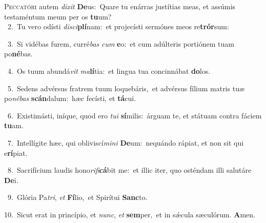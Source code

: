 \lettrine{\initial\textcolor{\initialcolor}{P}}{eccatóri} autem \textit{di}\-\textit{xit} \textbf{De}\-us:~\star Quare tu enárras justítias meas, et assúmis testaméntum meum per os \textbf{tu}\-um?\\
{\numbfont\textcolor{\numbcolor}{~2.}}~Tu vero odísti \textit{di}\-\textit{sci}\textbf{plí}nam:~\star et projecísti sermónes meos re\-\textbf{trór}\-sum:\par
{\numbfont\textcolor{\numbcolor}{~3.}}~Si vidébas furem, curré\textit{bas} \textit{cum} \textbf{e}\-o:~\star et cum adúlteris portiónem tuam po\-\textbf{né}\-bas.\par
{\numbfont\textcolor{\numbcolor}{~4.}}~Os tuum abundá\textit{vit} \textit{ma}\-\textbf{lí}tia:~\star et lingua tua concinnábat \textbf{do}\-los.\par
{\numbfont\textcolor{\numbcolor}{~5.}}~Sedens advérsus fratrem tuum loquebáris,~\dagger et advérsus fílium matris tuæ po\-\textit{né}\-\textit{bas} \textbf{scán}\-dalum:~\star hæc fecísti, et \textbf{tá}\-cui.\par
{\numbfont\textcolor{\numbcolor}{~6.}}~Existimásti, iníque, quod ero \textit{tu}\-\textit{i} \textbf{sí}\-milis:~\star árguam te, et státuam contra fáciem \textbf{tu}\-am.\par
{\numbfont\textcolor{\numbcolor}{~7.}}~Intellígite hæc, qui obliviscí\-\textit{mi}\-\textit{ni} \textbf{De}\-um:~\star nequándo rápiat, et non sit qui e\-\textbf{rí}\-piat.\par
{\numbfont\textcolor{\numbcolor}{~8.}}~Sacrifícium laudis hono\-\textit{ri}\-\textit{fi}\textbf{cá}bit me:~\star et illic iter, quo osténdam illi salutáre \textbf{De}\-i.\par
{\numbfont\textcolor{\numbcolor}{~9.}}~Glória Pa\-\textit{tri}\-, \textit{et} \textbf{Fí}\-lio,~\star et Spirítui \textbf{Sanc}\-to.\par
{\numbfont\textcolor{\numbcolor}{10.}}~Sicut erat in princípio, et \textit{nunc}\-, \textit{et} \textbf{sem}\-per,~\star et in sǽcula sæculórum. \textbf{A}\-men.\par
